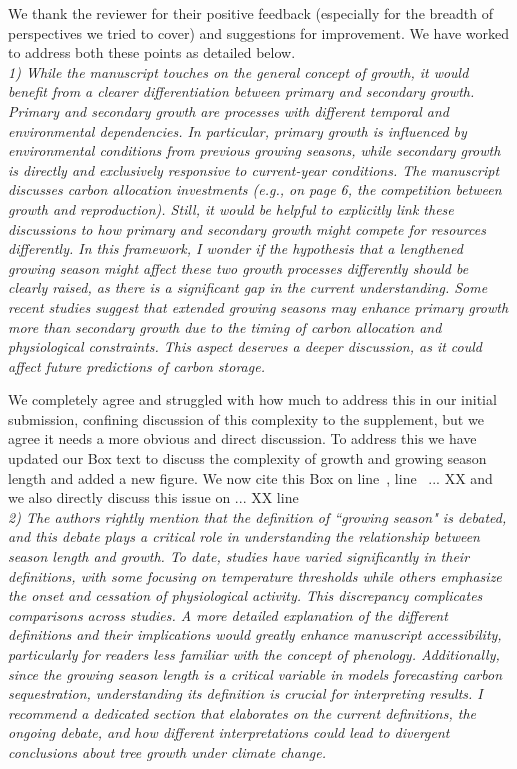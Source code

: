 \documentclass[11pt]{article}
\newcommand{\lr}[1]{line~\lineref{#1}}
\begin{document}
We thank the reviewer for their positive feedback (especially for the breadth of perspectives we tried to cover) and suggestions for improvement. We have worked to address both these points as detailed below.\\

\emph{1) While the manuscript touches on the general concept of growth, it would benefit from a clearer differentiation between primary and secondary growth. Primary and secondary growth are processes with different temporal and environmental dependencies. In particular, primary growth is influenced by environmental conditions from previous growing seasons, while secondary growth is directly and exclusively responsive to current-year conditions. The manuscript discusses carbon allocation investments (e.g., on page 6, the competition between growth and reproduction). Still, it would be helpful to explicitly link these discussions to how primary and secondary growth might compete for resources differently. In this framework, I wonder if the hypothesis that a lengthened growing season might affect these two growth processes differently should be clearly raised, as there is a significant gap in the current understanding. Some recent studies suggest that extended growing seasons may enhance primary growth more than secondary growth due to the timing of carbon allocation and physiological constraints. This aspect deserves a deeper discussion, as it could affect future predictions of carbon storage.}

We completely agree and struggled with how much to address this in our initial submission, confining discussion of this complexity to the supplement, but we agree it needs a more obvious and direct discussion. To address this we have updated our Box text to discuss the complexity of growth and growing season length and added a new figure. We now cite this Box on \lr{R1box1}, \lr{R1box2} ...  XX and we also directly discuss this issue on ... XX \lr{R1growth} \\


\emph{2) The authors rightly mention that the definition of ``growing season" is debated, and this debate plays a critical role in understanding the relationship between season length and growth. To date, studies have varied significantly in their definitions, with some focusing on temperature thresholds while others emphasize the onset and cessation of physiological activity. This discrepancy complicates comparisons across studies. A more detailed explanation of the different definitions and their implications would greatly enhance manuscript accessibility, particularly for readers less familiar with the concept of phenology. Additionally, since the growing season length is a critical variable in models forecasting carbon sequestration, understanding its definition is crucial for interpreting results. I recommend a dedicated section that elaborates on the current definitions, the ongoing debate, and how different interpretations could lead to divergent conclusions about tree growth under climate change.}
\end{document}
